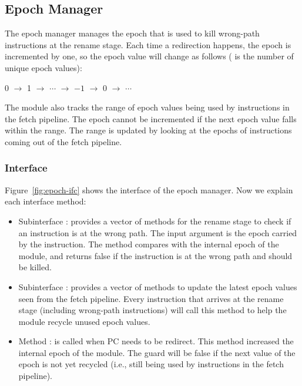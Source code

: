 \subsection{Epoch Manager}

The epoch manager manages the epoch that is used to kill wrong-path instructions at the rename stage.
Each time a redirection happens, the epoch is incremented by one, so the epoch value will change as follows ( is the number of unique epoch values):
\begin{center}
    0 $\rightarrow$ 1 $\rightarrow$ $\cdots$ $\rightarrow$ $-1$ $\rightarrow$ 0 $\rightarrow$ $\cdots$
\end{center}
The module also tracks the range of epoch values being used by instructions in the fetch pipeline.
The epoch cannot be incremented if the next epoch value falls within the range.
The range is updated by looking at the epochs of instructions coming out of the fetch pipeline.

\subsubsection{Interface}
Figure~\ref{fig:epoch-ifc} shows the interface of the epoch manager.
Now we explain each interface method:
\begin{itemize}
    \item Subinterface : provides a vector of methods for the rename stage to check if an instruction is at the wrong path.
    The input argument  is the epoch carried by the instruction.
    The method compares  with the internal epoch of the module, and returns false if the instruction is at the wrong path and should be killed.
    
    \item Subinterface : provides a vector of methods to update the latest epoch values seen from the fetch pipeline.
    Every instruction that arrives at the rename stage (including wrong-path instructions) will call this method to help the module recycle unused epoch values.
    
    \item Method : is called when PC needs to be redirect.
    This method increased the internal epoch of the module.
    The guard will be false if the next value of the epoch is not yet recycled (i.e., still being used by instructions in the fetch pipeline).
\end{itemize}

